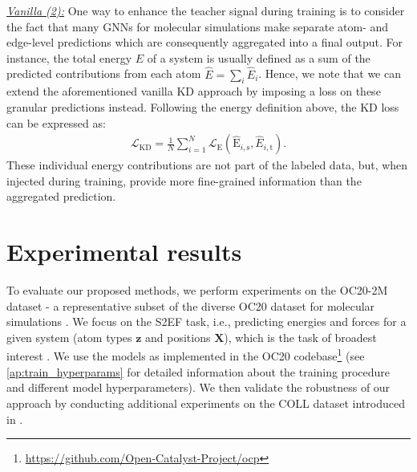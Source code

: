 \documentclass{article}
\newcommand{\loss}{\mathcal{L}}
\begin{document}
\underline{\emph{Vanilla (2):}}
One way to enhance the teacher signal during training is to consider the fact that many GNNs for molecular simulations make separate atom- and edge-level predictions which are consequently aggregated into a final output. For instance, the total energy $E$ of a system is usually defined as a sum of the predicted contributions from each atom $\hat{E} = \sum_i \hat{E}_i$. Hence, we note that we can extend the aforementioned vanilla KD approach by imposing a loss on these granular predictions instead. Following the energy definition above, the KD loss can be expressed as:
\begin{align}
    \loss_{\text{KD}} = \frac{1}{N} \sum_{i=1}^N \loss_\text{E}(\hat{\text{E}}_{i,\text{s}}, \hat{E}_{i,\text{t}}).
\end{align}
These individual energy contributions are not part of the labeled data, but, when injected during training, provide more fine-grained information than the aggregated prediction.

\section{Experimental results}
To evaluate our proposed methods, we perform experiments on the OC20-2M \cite{chanussot_open_2021} dataset - a representative subset of the diverse OC20 dataset for molecular simulations \cite{gasteiger_gemnet_oc_2022}. We focus on the S2EF task, i.e., predicting energies and forces for a given system (atom types $\boldsymbol{z}$ and positions $\boldsymbol{X}$), which is the task of broadest interest \cite{chanussot_open_2021}. We use the models as implemented in the OC20 codebase\footnote{\url{https://github.com/Open-Catalyst-Project/ocp}} 
(see \cref{ap:train_hyperparams} for detailed information about the training procedure and different model hyperparameters). We then validate the robustness of our approach by conducting additional experiments on the COLL dataset introduced in \cite{gasteiger_dimenetpp_2020}.
\end{document}
